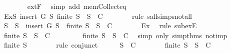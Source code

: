 \begin{isabellebody}
\ \ \ \ \ \ \isamarkupfalse%
\ extF\ \isamarkupfalse%
\ {\isacharparenleft}simp\ add{\isacharcolon}\ mem{\isacharunderscore}Collect{\isacharunderscore}eq{\isacharparenright}\isanewline
\ \ \ \ \isamarkupfalse%
\ \isamarkupfalse%
\ Ex{}{\isacharcolon}{\isachardoublequoteopen}{\isasymexists}S{\isacharprime}{\isasymsubseteq}\ {\isacharparenleft}insert\ G\ S{\isacharparenright}{\isachardot}\ {\isasymnot}{\isacharparenleft}finite\ S{\isacharprime}\ {\isasymlongrightarrow}\ S{\isacharprime}\ {\isasymin}\ C{\isacharparenright}{\isachardoublequoteclose}\isanewline
\ \ \ \ \ \ \isamarkupfalse%
\ {\isacharparenleft}rule\ sall{\isacharunderscore}simps{\isacharunderscore}not{\isacharunderscore}all{\isacharparenright}\isanewline
\ \ \ \ \isamarkupfalse%
\ S{}\ \ {\isachardoublequoteopen}S{}\ {\isasymsubseteq}\ insert\ G\ S{\isachardoublequoteclose}\ \ {\isachardoublequoteopen}{\isasymnot}{\isacharparenleft}finite\ S{}\ {\isasymlongrightarrow}\ S{}\ {\isasymin}\ C{\isacharparenright}{\isachardoublequoteclose}\isanewline
\ \ \ \ \ \ \isamarkupfalse%
\ Ex{}\ \isamarkupfalse%
\ {\isacharparenleft}rule\ subexE{\isacharparenright}\isanewline
\ \ \ \ \isamarkupfalse%
\ {\isachardoublequoteopen}finite\ S{}\ {\isasymand}\ S{}\ {\isasymnotin}\ C{\isachardoublequoteclose}\ \isanewline
\ \ \ \ \ \ \isamarkupfalse%
\ {\isacartoucheopen}{\isasymnot}{\isacharparenleft}finite\ S{}\ {\isasymlongrightarrow}\ S{}\ {\isasymin}\ C{\isacharparenright}{\isacartoucheclose}\ \isamarkupfalse%
\ {\isacharparenleft}simp\ only{\isacharcolon}\ simp{\isacharunderscore}thms{\isacharparenleft}{}{\isacharparenright}\ not{\isacharunderscore}imp{\isacharparenright}\isanewline
\ \ \ \ \isamarkupfalse%
\ \isamarkupfalse%
\ {\isachardoublequoteopen}finite\ S{}{\isachardoublequoteclose}\isanewline
\ \ \ \ \ \ \isamarkupfalse%
\ {\isacharparenleft}rule\ conjunct{}{\isacharparenright}\isanewline
\ \ \ \ \isamarkupfalse%
\ {\isachardoublequoteopen}S{}\ {\isasymnotin}\ C{\isachardoublequoteclose}\isanewline
\ \ \ \ \ \ \isamarkupfalse%
\ {\isacartoucheopen}finite\ S{}\ {\isasymand}\ S{}\ {\isasymnotin}\ C{\isacartoucheclose}\ \isamarkupfalse%

\end{isabellebody}
